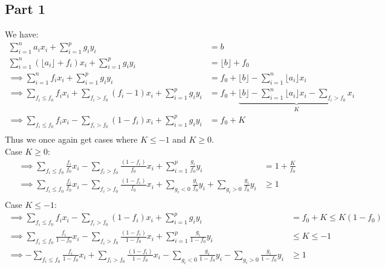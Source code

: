 \documentclass{article}
\begin{document}
    \subsection*{Part 1}
    We have:
    \begin{align*}
        \sum_{i=1}^{n} a_i x_i + \sum_{i=1}^{p} g_i y_i &= b\\
        \sum_{i=1}^{n}\left( \lfloor a_i \rfloor + f_i \right) x_i + \sum_{i=1}^{p} g_i y_i &= \lfloor b \rfloor + f_0\\
        \implies \sum_{i=1}^{n} f_i x_i + \sum_{i=1}^{p} g_i y_i &= f_0 + \lfloor b \rfloor - \sum_{i=1}^{n} \lfloor a_i \rfloor x_i\\
        \implies \sum_{f_i\leq f_0} f_i x_i + \sum_{f_i > f_0} \left(f_i-1\right) x_i + \sum_{i=1}^{p} g_i y_i &= f_0 +  \underbrace{\lfloor b \rfloor - \sum_{i=1}^{n} \lfloor a_i \rfloor x_i - \sum_{f_i>f_0}x_i}_{K} \\
        \implies \sum_{f_i\leq f_0} f_i x_i - \sum_{f_i > f_0} \left(1-f_i\right) x_i + \sum_{i=1}^{p} g_i y_i &= f_0 + K\\
    \end{align*}
    Thus we once again get cases where $K\leq-1$ and $K\geq 0$.\\
    Case $K\geq 0$:
    \begin{align*}
        \implies \sum_{f_i\leq f_0} \frac{f_i}{f_0} x_i - \sum_{f_i > f_0} \frac{\left(1-f_i\right)}{f_0} x_i + \sum_{i=1}^{p} \frac{g_i}{f_0} y_i &= 1+\frac{K}{f_0}\\
        \implies \sum_{f_i\leq f_0} \frac{f_i}{f_0} x_i - \sum_{f_i > f_0} \frac{\left(1-f_i\right)}{f_0} x_i + \sum_{g_i<0} \frac{g_i}{f_0} y_i + \sum_{g_i>0}\frac{g_i}{f_0} y_i &\geq 1\\
    \end{align*}
    Case $K\leq -1$:
    \begin{align*}
        \implies \sum_{f_i\leq f_0} f_i x_i - \sum_{f_i > f_0} \left(1-f_i\right) x_i + \sum_{i=1}^{p} g_i y_i &= f_0 + K \leq K\left(1-f_0\right)\\
        \implies \sum_{f_i\leq f_0} \frac{f_i}{1-f_0} x_i - \sum_{f_i > f_0} \frac{\left(1-f_i\right)}{1-f_0} x_i + \sum_{i=1}^{p} \frac{g_i}{1-f_0} y_i &\leq K \leq -1\\
        \implies -\sum_{f_i\leq f_0} \frac{f_i}{1-f_0} x_i + \sum_{f_i > f_0} \frac{\left(1-f_i\right)}{1-f_0} x_i - \sum_{g_i<0}\frac{g_i}{1-f_0} y_i - \sum_{g_i>0} \frac{g_i}{1-f_0} y_i&\geq 1\\
    \end{align*}
\end{document}
